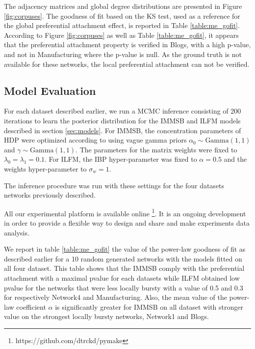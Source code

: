 The adjacency matrices and global degree distributions are presented in Figure \ref{fig:corpuses}. The goodness of fit based on the KS test, used as a reference for the global preferential attachment effect, is reported in Table \ref{table:me_gofit}. According to Figure \ref{fig:corpuses} as well as Table \ref{table:me_gofit}, it appears that the preferential attachment property is verified in Blogs, with a high p-value, and not in Manufacturing where the p-value is null. As the ground truth is not available for these networks, the local preferential attachment can not be verified.






\subsection{Model Evaluation}
For each dataset described earlier, we run a MCMC inference consisting of 200 iterations to learn the posterior distribution for the IMMSB and ILFM  models described in section \ref{sec:models}. For IMMSB, the concentration parameters of HDP were optimized according to  \cite{HDP} using vague gamma priors $\alpha_0 \sim \text{Gamma}(1,1)$ and $\gamma \sim \text{Gamma}(1,1)$. The parameters for the matrix weights were fixed to $\lambda_0=\lambda_1=0.1$. For ILFM, the IBP hyper-parameter was fixed to $\alpha=0.5$ and the weights hyper-parameter to $\sigma_w = 1$. 

The inference procedure was run with these settings for the four datasets networks previously described.

All our experimental platform is available online \footnote{https://github.com/dtrckd/pymake}. It is an ongoing development in order to provide a flexible way to design and share and make experiments data analysis.

We report in table \ref{table:me_gofit} the value of the power-law goodness of fit as described earlier for a 10 random generated networks with the models fitted on all four dataset. This table shows that the IMMSB comply with the preferential attachment with a maximal pvalue for each datasets while ILFM obtained low pvalue for the networks that were less locally bursty with a value of 0.5 and 0.3 for respectively Network4 and Manufacturing. Also, the mean value of the power-law coefficient $\alpha$ is significantly greater for IMMSB on all dataset with stronger value on the strongest locally bursty networks, Network1 and Blogs.

